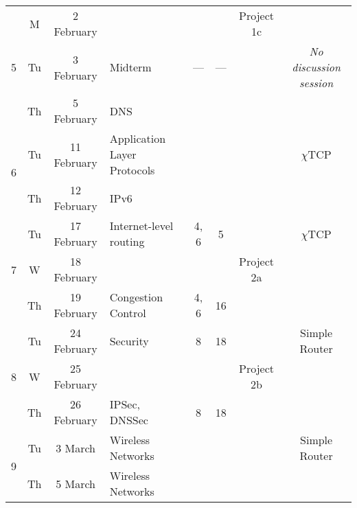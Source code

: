\documentclass[11pt]{article}
\newcommand{\chitcp}{$\chi$\textsf{TCP}}
\begin{document}
\begin{sidewaystable}
\begin{tabular}{|c|cc||p{6cm}|c|c|c|c|}
\multirow{3}{*}{5}  & M  & 2 February   & \cellcolor[gray]{0.9}  & \cellcolor[gray]{0.9}   & \cellcolor[gray]{0.9}  & Project 1c  & \cellcolor[gray]{0.9} \\\cline{2-6}
                    & Tu & 3 February   & Midterm                                         & ---    & ---  & \cellcolor[gray]{0.9}  & \emph{No discussion session} \\\cline{2-6}
                    & Th & 5 February   & DNS                                             &     &   & \cellcolor[gray]{0.9}  & \cellcolor[gray]{0.9} \\\hline\hline

\multirow{2}{*}{6}  & Tu & 11 February  & Application Layer Protocols &  &   & \cellcolor[gray]{0.9}  & \chitcp \\\cline{2-6}
                    & Th & 12 February  & IPv6                 &     &       & \cellcolor[gray]{0.9}  & \cellcolor[gray]{0.9} \\\hline\hline

\multirow{3}{*}{7}  & Tu & 17 February  & Internet-level routing                    & 4, 6 & 5       & \cellcolor[gray]{0.9} & \chitcp \\\cline{2-6}
                    & W  & 18 February  & \cellcolor[gray]{0.9} & \cellcolor[gray]{0.9} & \cellcolor[gray]{0.9} & Project 2a & \cellcolor[gray]{0.9} \\\cline{2-6}
                    & Th & 19 February  & Congestion Control                              & 4, 6 & 16      & \cellcolor[gray]{0.9}  & \cellcolor[gray]{0.9} \\\hline\hline

\multirow{3}{*}{8}  & Tu & 24 February  & Security                                        & 8    & 18      & \cellcolor[gray]{0.9}  & Simple Router \\\cline{2-6}
                    & W  & 25 February  & \cellcolor[gray]{0.9} & \cellcolor[gray]{0.9} & \cellcolor[gray]{0.9} & Project 2b & \cellcolor[gray]{0.9} \\\cline{2-6}
                    & Th & 26 February  & IPSec, DNSSec                                   & 8    & 18      & \cellcolor[gray]{0.9}  & \cellcolor[gray]{0.9} \\\hline\hline

\multirow{2}{*}{9}  & Tu & 3 March      & Wireless Networks                               &     &        & \cellcolor[gray]{0.9}  & Simple Router \\\cline{2-6}
                    & Th & 5 March      & Wireless Networks                               &     &        & \cellcolor[gray]{0.9}  & \cellcolor[gray]{0.9} \\\hline\hline


\end{tabular}
\end{sidewaystable}
\end{document}
